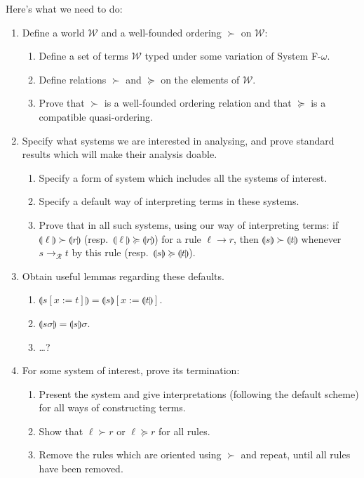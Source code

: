 \documentclass[runningheads,a4paper]{llncs}
\newcommand{\World}{\mathcal{W}}
\newcommand{\Rules}{\mathcal{R}}
\newcommand{\interpret}[1]{\llparenthesis #1 \rrparenthesis}
\newcommand{\arr}[1]{\to_{#1}}
\begin{document}
Here's what we need to do:
\begin{enumerate}
\item Define a world $\World$ and a well-founded ordering $\succ$ on
  $\World$:
  \begin{enumerate}
  \item Define a set of terms $\World$ typed under some variation of
    System F-$\omega$.
  \item Define relations $\succ$ and $\succeq$ on the elements of $\World$.
  \item Prove that $\succ$ is a well-founded ordering relation and that
    $\succeq$ is a compatible quasi-ordering.
  \end{enumerate}
\item Specify what systems we are interested in analysing, and prove
  standard results which will make their analysis doable.
  \begin{enumerate}
  \item Specify a form of system which includes all the systems of interest.
  \item Specify a default way of interpreting terms in these systems.
  \item Prove that in all such systems, using our way of interpreting
    terms: if $\interpret{\ell} \succ \interpret{r}$ (resp.\ $\interpret{
    \ell} \succeq \interpret{r}$) for a rule  $\ell \to r$, then
    $\interpret{s} \succ \interpret{t}$ whenever $s \arr{\Rules} t$ by
    this rule (resp.\ $\interpret{s} \succeq \interpret{t}$).
  \end{enumerate}
\item Obtain useful lemmas regarding these defaults.
  \begin{enumerate}
  \item $\interpret{s[x:=t]} = \interpret{s}[x:=\interpret{t}]$.
  \item $\interpret{s\sigma} = \interpret{s}\sigma$.
  \item \dots?
  \end{enumerate}
\item For some system of interest, prove its termination:
  \begin{enumerate}
  \item Present the system and give interpretations (following the
    default scheme) for all ways of constructing terms.
  \item Show that $\ell \succ r$ or $\ell \succeq r$ for all rules.
  \item Remove the rules which are oriented using $\succ$ and repeat,
    until all rules have been removed.
  \end{enumerate}
\end{enumerate}
\end{document}
